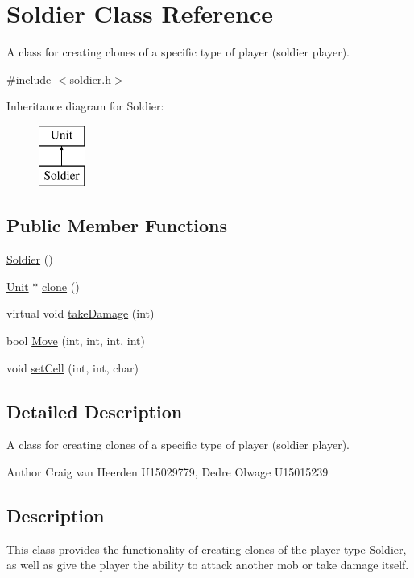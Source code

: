 \hypertarget{class_soldier}{\section{\-Soldier \-Class \-Reference}
\label{class_soldier}
}


\-A class for creating clones of a specific type of player (soldier player).  




{\ttfamily \#include $<$soldier.\-h$>$}

\-Inheritance diagram for \-Soldier\-:\begin{figure}[H]
\begin{center}
\leavevmode
\includegraphics[height=2.000000cm]{class_soldier}
\end{center}
\end{figure}
\subsection*{\-Public \-Member \-Functions}
\begin{DoxyCompactItemize}
\item 
\hyperlink{class_soldier_ad3144b22a146ef85eaff30a2a5ab78c0}{\-Soldier} ()
\item 
\hyperlink{class_unit}{\-Unit} $\ast$ \hyperlink{class_soldier_a6491ed3b4102643c504cf07392b01544}{clone} ()
\item 
virtual void \hyperlink{class_soldier_a8ec154c6e597a4b2973a7e832f97f402}{take\-Damage} (int)
\item 
bool \hyperlink{class_soldier_a6dcd4745e2108c9b231e01afebb584d1}{\-Move} (int, int, int, int)
\item 
void \hyperlink{class_soldier_a5eb6904e8716099dd52c306154751eba}{set\-Cell} (int, int, char)
\end{DoxyCompactItemize}


\subsection{\-Detailed \-Description}
\-A class for creating clones of a specific type of player (soldier player). 

\begin{DoxyAuthor}{\-Author}
\-Craig van \-Heerden \-U15029779, \-Dedre \-Olwage \-U15015239
\end{DoxyAuthor}
\hypertarget{class_unit_factory_Description}{}\subsection{\-Description}\label{class_unit_factory_Description}
\-This class provides the functionality of creating clones of the player type \hyperlink{class_soldier}{\-Soldier}, as well as give the player the ability to attack another mob or take damage itself. 

